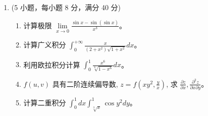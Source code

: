 \begin{enumerate}
\newpage
\item
(5 小题，每小题 8 分，满分 40 分)
\begin{enumerate}
	\item
计算极限 $\lim\limits _{x \rightarrow 0} \frac{\sin x-\sin (\sin x)}{x^{3}}$。
	
	
	\item
	计算广义积分 $\int_{0}^{+\infty} \frac{x}{\left(2+x^{2}\right) \sqrt{1+x^{2}}} d x$。
	


\item
 利用欧拉积分计算 $\int_{0}^{1} \frac{x^{6}}{\sqrt[6]{1-x^{6}}} d x$。


\item
$f(u, v)$ 具有二阶连续偏导数, $z=f\left(x y^{2}, \frac{y}{x}\right)$, 求 $\frac{\partial z}{\partial x}, \frac{\partial^{2} z}{\partial x \partial y}$。


\item
计算二重积分 $\int_{0}^{1} d x \int_{\sqrt[3]{x}}^{1} \cos y^{2} d y$。
	
	
	
\end{enumerate}



\end{enumerate}
